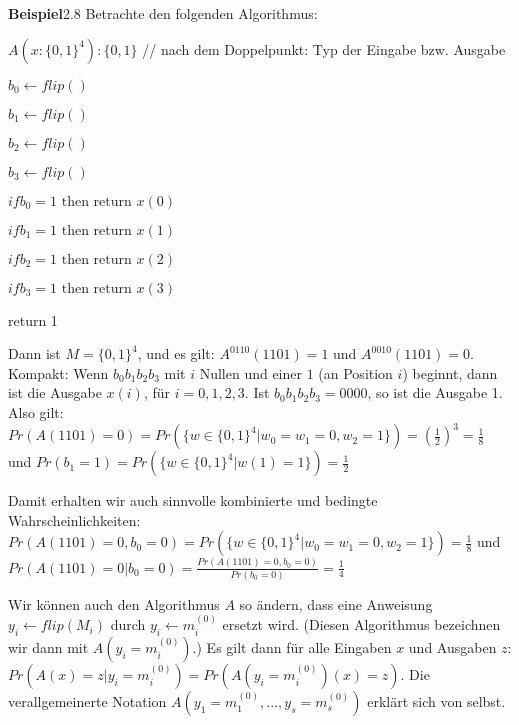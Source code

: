 \documentclass[a4paper]{article}
\begin{document}
\begin{multicols}{3}
    \textbf{Beispiel}2.8 Betrachte den folgenden Algorithmus:
    \begin{itemize*}
        \item $A(x:\{0,1\}^4):\{0,1\}$    // nach dem Doppelpunkt: Typ der Eingabe bzw. Ausgabe
        \item $b_0 \leftarrow flip()$
        \item $b_1 \leftarrow flip()$
        \item $b_2 \leftarrow flip()$
        \item $b_3 \leftarrow flip()$
        \item $if b_0 = 1 \text{ then return } x(0)$
        \item $if b_1 = 1 \text{ then return } x(1)$
        \item $if b_2 = 1 \text{ then return } x(2)$
        \item $if b_3 = 1 \text{ then return } x(3)$
        \item return 1
    \end{itemize*}

    Dann ist $M=\{0,1\}^4$, und es gilt: $A^{0110}(1101)=1$ und $A^{0010}(1101)=0$. Kompakt: Wenn $b_0 b_1 b_2 b_3$ mit $i$ Nullen und einer $1$ (an Position $i$) beginnt, dann ist die Ausgabe $x(i)$, für $i=0,1,2,3$. Ist $b_0 b_1 b_2 b_3=0000$, so ist die Ausgabe 1. Also gilt: $Pr(A(1101)=0) = Pr(\{w\in\{0,1\}^4 |w_0=w_1=0, w_2=1\}) =(\frac{1}{2})^3 =\frac{1}{8}$ und $Pr(b_1=1) =Pr(\{w\in\{0,1\}^4 |w(1)=1\})=\frac{1}{2}$

    Damit erhalten wir auch sinnvolle kombinierte und bedingte Wahrscheinlichkeiten: $Pr(A(1101)=0, b_0=0)= Pr(\{w\in\{0,1\}^4 |w_0=w_1=0, w_2=1\}) =\frac{1}{8}$ und $Pr(A(1101)=0| b_0=0) =\frac{Pr(A(1101)=0, b_0=0)}{Pr(b_0=0)}=\frac{1}{4}$

    Wir können auch den Algorithmus $A$ so ändern, dass eine Anweisung $y_i\leftarrow flip(M_i)$ durch $y_i\leftarrow m^{(0)}_i$ ersetzt wird. (Diesen Algorithmus bezeichnen wir dann mit $A(y_i=m^{(0)}_i)$.) Es gilt dann für alle Eingaben $x$ und Ausgaben $z$: $Pr(A(x)=z| y_i=m^{(0)}_i) =Pr(A(y_i=m^{(0)}_i)(x) =z)$. Die verallgemeinerte Notation $A(y_1=m^{(0)}_1,...,y_s=m^{(0)}_s)$ erklärt sich von selbst.


\end{multicols}
\end{document}
